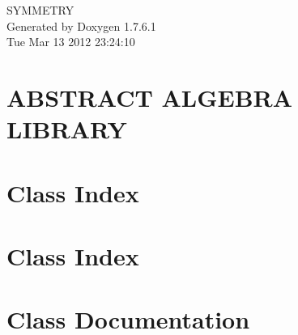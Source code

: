 \documentclass[a4paper]{book}
\begin{document}
\hypersetup{pageanchor=false,citecolor=blue}
\begin{titlepage}
\vspace*{7cm}
\begin{center}
{\Large \-S\-Y\-M\-M\-E\-T\-R\-Y }\\
\vspace*{1cm}
{\large \-Generated by Doxygen 1.7.6.1}\\
\vspace*{0.5cm}
{\small Tue Mar 13 2012 23:24:10}\\
\end{center}
\end{titlepage}
\clearemptydoublepage
{}
\tableofcontents
\clearemptydoublepage
{}
\hypersetup{pageanchor=true,citecolor=blue}
\chapter{\-A\-B\-S\-T\-R\-A\-C\-T \-A\-L\-G\-E\-B\-R\-A \-L\-I\-B\-R\-A\-R\-Y}
\label{index}\hypertarget{index}{}
\chapter{\-Class \-Index}

\chapter{\-Class \-Index}

\chapter{\-Class \-Documentation}





























\printindex
\end{document}
